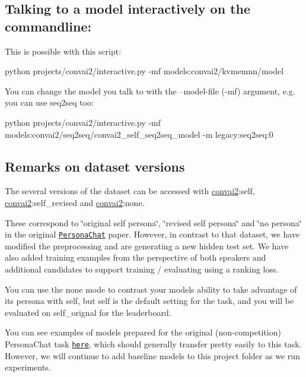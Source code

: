\subsection*{Talking to a model interactively on the commandline\+:}

This is possible with this script\+:


\begin{DoxyCode}
python projects/convai2/interactive.py -mf models:convai2/kvmemnn/model
\end{DoxyCode}


You can change the model you talk to with the \textquotesingle{}--model-\/file\textquotesingle{} (-\/mf) argument, e.\+g. you can use seq2seq too\+:


\begin{DoxyCode}
python projects/convai2/interactive.py -mf models:convai2/seq2seq/convai2\_self\_seq2seq\_model -m
       legacy:seq2seq:0
\end{DoxyCode}


\subsection*{Remarks on dataset versions}

The several versions of the dataset can be accessed with {\ttfamily \hyperlink{namespaceconvai2}{convai2}\+:self}, {\ttfamily \hyperlink{namespaceconvai2}{convai2}\+:self\+\_\+revised} and {\ttfamily \hyperlink{namespaceconvai2}{convai2}\+:none}.

These correspond to \char`\"{}original self persona\char`\"{}, \char`\"{}revised self persona\char`\"{} and \char`\"{}no persona\char`\"{} in the original \href{https://arxiv.org/pdf/1801.07243.pdf}{\tt Persona\+Chat} paper. However, in contrast to that dataset, we have modified the preprocessing and are generating a new hidden test set. We have also added training examples from the perspective of both speakers and additional candidates to support training / evaluating using a ranking loss.

You can use the {\ttfamily none} mode to contrast your model\textquotesingle{}s ability to take advantage of its persona with {\ttfamily self}, but {\ttfamily self} is the default setting for the task, and you will be evaluated on \textquotesingle{}self\+\_\+orignal\textquotesingle{} for the leaderboard.

You can see examples of models prepared for the original (non-\/competition) Persona\+Chat task \href{https://github.com/facebookresearch/ParlAI/tree/master/projects/personachat}{\tt here}, which should generally transfer pretty easily to this task. However, we will continue to add baseline models to this project folder as we run experiments. 